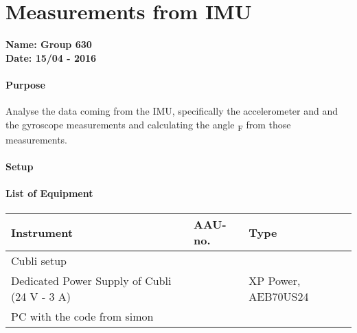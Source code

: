 \chapter{Measurements from IMU}\label{IMUMeasurementsAppendix} 
\textbf{Name: Group 630}\\
\textbf{Date: 15/04 - 2016}

\subsubsection{Purpose}
Analyse the data coming from the IMU, specifically the accelerometer and and the gyroscope measurements and calculating the angle \si{\theta_F} from those measurements.


\subsubsection{Setup}


\subsubsection{List of Equipment}
\begin{table}[H]
	\begin{tabular}{|l|l|p{4.3cm}|}
		\hline%
		\textbf{Instrument}                        &  \textbf{AAU-no.}  &  \textbf{Type}       \\
		\hline%
		Cubli setup                              &               &  		  \\
		\hline%
		Dedicated Power Supply of Cubli \small{(24 V - 3 A)} &               &  XP Power, AEB70US24 \\
		\hline%
		PC with the code from simon                &              &            \\
		\hline%
	\end{tabular}
\end{table}

